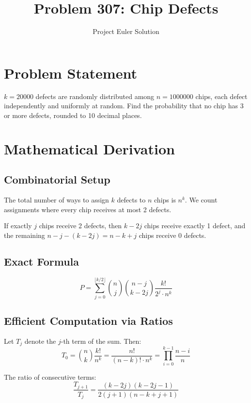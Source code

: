 \documentclass[12pt]{article}
\title{Problem 307: Chip Defects}
\author{Project Euler Solution}
\date{}
\begin{document}
\maketitle

\section{Problem Statement}
$k = 20000$ defects are randomly distributed among $n = 1000000$ chips, each defect independently and uniformly at random. Find the probability that no chip has 3 or more defects, rounded to 10 decimal places.

\section{Mathematical Derivation}

\subsection{Combinatorial Setup}
The total number of ways to assign $k$ defects to $n$ chips is $n^k$. We count assignments where every chip receives at most 2 defects.

If exactly $j$ chips receive 2 defects, then $k - 2j$ chips receive exactly 1 defect, and the remaining $n - j - (k-2j) = n - k + j$ chips receive 0 defects.

\subsection{Exact Formula}
\begin{equation}
    P = \sum_{j=0}^{\lfloor k/2 \rfloor} \binom{n}{j}\binom{n-j}{k-2j}\frac{k!}{2^j \cdot n^k}
\end{equation}

\subsection{Efficient Computation via Ratios}
Let $T_j$ denote the $j$-th term of the sum. Then:
\begin{equation}
    T_0 = \binom{n}{k}\frac{k!}{n^k} = \frac{n!}{(n-k)! \cdot n^k} = \prod_{i=0}^{k-1}\frac{n-i}{n}
\end{equation}

The ratio of consecutive terms:
\begin{equation}
    \frac{T_{j+1}}{T_j} = \frac{(k - 2j)(k - 2j - 1)}{2(j+1)(n - k + j + 1)}
\end{equation}
\end{document}
